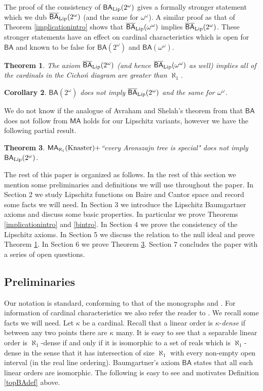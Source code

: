 \documentclass[leqno,11pt]{amsart}
\newtheorem{theorem}{Theorem}[section]
\newtheorem{corollary}[theorem]{Corollary}
\theoremstyle{definition}
\theoremstyle{remark}
\def\MA{\mathsf{MA}}
\def\BA{\mathsf{BA}}
\def\baire{\omega^\omega}
\def\cantor{2^\omega}
\begin{document}
The proof of the consistency of $\BA_{\rm Lip} (\cantor)$ gives a formally stronger statement which we dub $\overline{\BA}_{\rm Lip}(\cantor)$ (and the same for $\baire$). A similar proof as that of Theorem \ref{implicationintro} shows that $\overline{\BA}_{\rm Lip}(\baire)$ implies $\overline{\BA}_{\rm Lip}(\cantor)$. These stronger statements have an effect on cardinal characteristics which is open for $\BA$ and known to be false for $\BA (\cantor)$ and $\BA (\baire)$.
\begin{theorem}
    The axiom $\overline{\BA}_{\rm Lip}(2^\omega)$ (and hence $\overline{\BA}_{\rm Lip}(\baire)$ as well) implies all of the cardinals in the Cicho\'{n} diagram are greater than $\aleph_1$. \label{cichonintro}
\end{theorem}

\begin{corollary}
    $\BA (\cantor)$ does not imply $\overline{\BA}_{\rm Lip}(\cantor)$ and the same for $\baire$.
\end{corollary}

We do not know if the analogue of Avraham and Shelah's theorem from \cite{AvrahamShelah81} that $\BA$ does not follow from $\MA$ holds for our Lipschitz variants, however we have the following partial result.
\begin{theorem}
    $\MA_{\rm \aleph_1} ({\rm Knaster}) +$``every Aronszajn tree is special" does not imply $\BA_{\rm Lip} (\cantor)$.  \label{MAintro}
\end{theorem}

The rest of this paper is organized as follows. In the rest of this section we mention some preliminaries and definitions we will use throughout the paper. In Section 2 we study Lipschitz functions on Baire and Cantor space and record some facts we will need. In Section 3 we introduce the Lipschitz Baumgartner axioms and discuss some basic properties. In particular we prove Theorems \ref{implicationintro} and \ref{bintro}. In Section 4 we prove the consistency of the Lipschitz axioms. In Section 5 we discuss the relation to the null ideal and prove Theorem \ref{cichonintro}. In Section 6 we prove Theorem \ref{MAintro}. Section 7 concludes the paper with a series of open questions. 
\subsection{Preliminaries}

Our notation is standard, conforming to that of the monographs \cite{KenST} and \cite{JechST}. For information of cardinal characteristics we also refer the reader to \cite{BarJu95}. We recall some facts we will need. Let $\kappa$ be a cardinal. Recall that a linear order is $\kappa$-{\em dense} if between any two points there are $\kappa$ many. It is easy to see that a separable linear order is $\aleph_1$-dense if and only if it is isomorphic to a set of reals which is $\aleph_1$-dense in the sense that it has intersection of size $\aleph_1$ with every non-empty open interval (in the real line ordering). Baumgartner's axiom $\BA$ states that all such linear orders are isomorphic. The following is easy to see and motivates Definition \ref{topBAdef} above.
\end{document}
